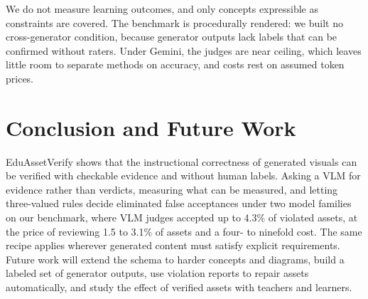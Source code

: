 \documentclass[conference]{IEEEtran}
\begin{document}
We do not measure learning outcomes, and only concepts expressible as constraints are covered. The benchmark is procedurally rendered: we built no cross-generator condition, because generator outputs lack labels that can be confirmed without raters. Under Gemini, the judges are near ceiling, which leaves little room to separate methods on accuracy, and costs rest on assumed token prices.

\section{Conclusion and Future Work}
EduAssetVerify shows that the instructional correctness of generated visuals can be verified with checkable evidence and without human labels. Asking a VLM for evidence rather than verdicts, measuring what can be measured, and letting three-valued rules decide eliminated false acceptances under two model families on our benchmark, where VLM judges accepted up to 4.3\% of violated assets, at the price of reviewing 1.5 to 3.1\% of assets and a four- to ninefold cost. The same recipe applies wherever generated content must satisfy explicit requirements. Future work will extend the schema to harder concepts and diagrams, build a labeled set of generator outputs, use violation reports to repair assets automatically, and study the effect of verified assets with teachers and learners.

\label{endofbody}


\end{document}
